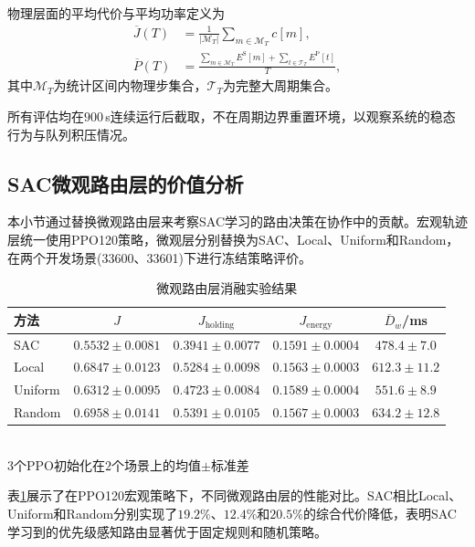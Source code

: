 物理层面的平均代价与平均功率定义为
\begin{equation}
\begin{aligned}
\overline J(T)&=\frac{1}{|\mathcal M_T|}
\sum_{m\in\mathcal M_T}c[m],\\
\overline P(T)&=\frac{\sum_{m\in\mathcal M_T}E^{\mathrm S}[m]
+\sum_{t\in\mathcal T_T}E^{\mathrm P}[t]}{T},
\end{aligned}
\label{eq:cost_power}
\end{equation}
其中$\mathcal M_T$为统计区间内物理步集合，$\mathcal T_T$为完整大周期集合。

所有评估均在$900\,$s连续运行后截取，不在周期边界重置环境，以观察系统的稳态行为与队列积压情况。

\subsection{SAC微观路由层的价值分析}
\label{ssec:sac_micro_value}

本小节通过替换微观路由层来考察SAC学习的路由决策在协作中的贡献。宏观轨迹层统一使用PPO120策略，微观层分别替换为SAC、Local、Uniform和Random，在两个开发场景(33600、33601)下进行冻结策略评价。

\begin{table}[htbp]
\centering
\caption{微观路由层消融实验结果}
\label{tab:micro_ablation}
\begin{tabular}{lcccc}
\toprule
方法 & $J$ & $J_{\mathrm{holding}}$ & $J_{\mathrm{energy}}$ & $\overline D_w$/ms \\
\midrule
SAC & $0.5532\pm0.0081$ & $0.3941\pm0.0077$ & $0.1591\pm0.0004$ & $478.4\pm7.0$ \\
Local & $0.6847\pm0.0123$ & $0.5284\pm0.0098$ & $0.1563\pm0.0003$ & $612.3\pm11.2$ \\
Uniform & $0.6312\pm0.0095$ & $0.4723\pm0.0084$ & $0.1589\pm0.0004$ & $551.6\pm8.9$ \\
Random & $0.6958\pm0.0141$ & $0.5391\pm0.0105$ & $0.1567\pm0.0003$ & $634.2\pm12.8$ \\
\bottomrule
\end{tabular}
\\[3pt]
\scriptsize $3$个PPO初始化在$2$个场景上的均值$\pm$标准差
\end{table}

表\ref{tab:micro_ablation}展示了在PPO120宏观策略下，不同微观路由层的性能对比。SAC相比Local、Uniform和Random分别实现了$19.2\%$、$12.4\%$和$20.5\%$的综合代价降低，表明SAC学习到的优先级感知路由显著优于固定规则和随机策略。

